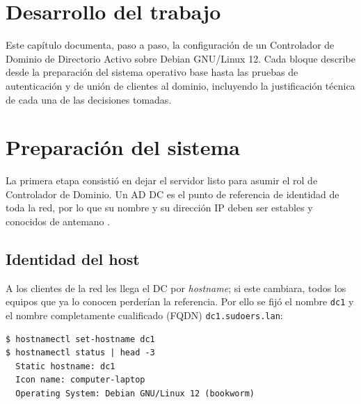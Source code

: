 
\section{Desarrollo del trabajo}

Este capítulo documenta, paso a paso, la configuración de un Controlador de
Dominio de Directorio Activo sobre Debian GNU/Linux 12. Cada bloque describe
desde la preparación del sistema operativo base hasta las pruebas de
autenticación y de unión de clientes al dominio, incluyendo la justificación
técnica de cada una de las decisiones tomadas.

\section{Preparación del sistema}

La primera etapa consistió en dejar el servidor listo para asumir el rol de
Controlador de Dominio. Un AD DC es el punto de referencia de identidad de
toda la red, por lo que su nombre y su dirección IP deben ser estables y
conocidos de antemano \citep{msft_activedirectory}.

\subsection{Identidad del host}

A los clientes de la red les llega el DC por \textit{hostname}; si este
cambiara, todos los equipos que ya lo conocen perderían la referencia. Por
ello se fijó el nombre \texttt{dc1} y el nombre completamente cualificado
(FQDN) \texttt{dc1.sudoers.lan}:

\begin{lstlisting}[style=terminal]
$ hostnamectl set-hostname dc1
$ hostnamectl status | head -3
  Static hostname: dc1
  Icon name: computer-laptop
  Operating System: Debian GNU/Linux 12 (bookworm)
\end{lstlisting}


